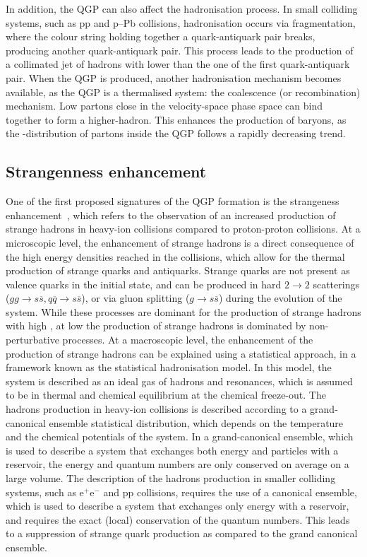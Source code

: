 In addition, the QGP can also affect the hadronisation process. In small colliding systems, such as pp and p--Pb collisions, hadronisation occurs via fragmentation, where the colour string holding together a quark-antiquark pair breaks, producing another quark-antiquark pair. This process leads to the production of a collimated jet of hadrons with \pt lower than the one of the first quark-antiquark pair. When the QGP is produced, another hadronisation mechanism becomes available, as the QGP is a thermalised system: the coalescence (or recombination) mechanism. Low \pt partons close in the velocity-space phase space can bind together to form a higher-\pt hadron. This enhances the production of baryons, as the \pt-distribution of partons inside the QGP follows a rapidly decreasing trend.

\subsection{Strangenness enhancement}
One of the first proposed signatures of the QGP formation is the strangeness enhancement~\cite{Rafelski:1982pu}, which refers to the observation of an increased production of strange hadrons in heavy-ion collisions compared to proton-proton collisions. At a microscopic level, the enhancement of strange hadrons is a direct consequence of the high energy densities reached in the collisions, which allow for the thermal production of strange quarks and antiquarks. Strange quarks are not present as valence quarks in the initial state, and can be produced in hard $2\rightarrow 2$ scatterings ($gg\rightarrow s\overline{s}, q\overline{q}\rightarrow s\overline{s}$), or via gluon splitting ($g\rightarrow s\overline{s}$) during the evolution of the system. While these processes are dominant for the production of strange hadrons with high \pt, at low \pt the production of strange hadrons is dominated by non-perturbative processes. At a macroscopic level, the enhancement of the production of strange hadrons can be explained using a statistical approach, in a framework known as the statistical hadronisation model. In this model, the system is described as an ideal gas of hadrons and resonances, which is assumed to be in thermal and chemical equilibrium at the chemical freeze-out. The hadrons production in heavy-ion collisions is described according to a grand-canonical ensemble statistical distribution, which depends on the temperature and the chemical potentials of the system. In a grand-canonical ensemble, which is used to describe a system that exchanges both energy and particles with a reservoir, the energy and quantum numbers are only conserved on average on a large volume. The description of the hadrons production in smaller colliding systems, such as $\mathrm{e^+e^-}$ and pp collisions, requires the use of a canonical ensemble, which is used to describe a system that exchanges only energy with a reservoir, and requires the exact (local) conservation of the quantum numbers. This leads to a suppression of strange quark production as compared to the grand canonical ensemble. 

